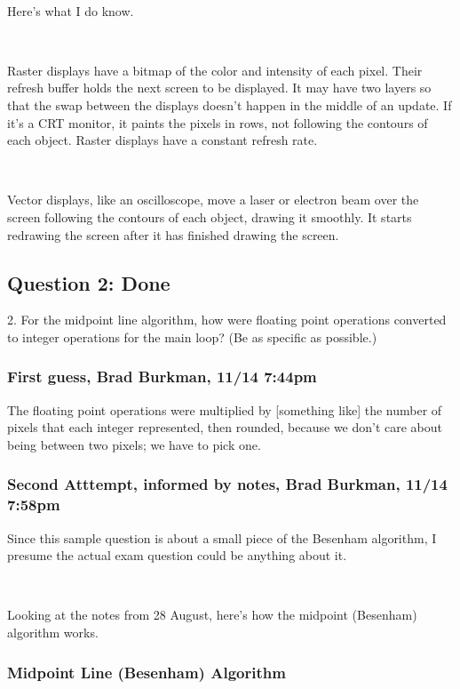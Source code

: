 \documentclass[11pt]{article}
\begin{document}
\begin{spacing}{1.2}
\

Here's what I do know.  

\

Raster displays have a bitmap of the color and intensity of each pixel.  Their refresh buffer holds the next screen to be displayed.  It may have two layers so that the swap between the displays doesn't happen in the middle of an update.  If it's a CRT monitor, it paints the pixels in rows, not following the contours of each object.  Raster displays have a constant refresh rate.  

\

Vector displays, like an oscilloscope, move a laser or electron beam over the screen following the contours of each object, drawing it smoothly.  It starts redrawing the screen after it has finished drawing the screen.  



\subsection{Question 2:  Done}
2.  For the midpoint line algorithm, how were floating point operations converted to integer operations for the main loop?  (Be as specific as possible.)

\subsubsection{First guess, Brad Burkman, 11/14 7:44pm}
The floating point operations were multiplied by [something like] the number of pixels that each integer represented, then rounded, because we don't care about being between two pixels; we have to pick one.  

\subsubsection{Second Atttempt, informed by notes, Brad Burkman, 11/14 7:58pm}
Since this sample question is about a small piece of the Besenham algorithm, I presume the actual exam question could be anything about it.  

\

Looking at the notes from 28 August, here's how the midpoint (Besenham) algorithm works.

\subsubsection{Midpoint Line (Besenham) Algorithm}


\end{spacing}
\end{document}
